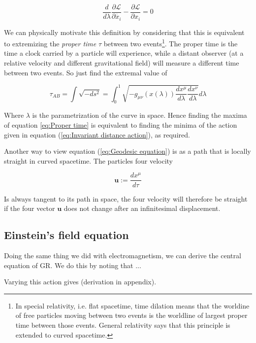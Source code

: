 \begin{equation}
    \frac{d}{d\lambda} \frac{\partial \mathcal{L}}{\partial \dot{x_i}} - \frac{\partial \mathcal{L}}{\partial x_i} = 0
\label{eq:Euler-Lagrange equation}
\end{equation}

We can physically motivate this definition by considering that this is equivalent to extremizing the \textit{proper time} $\tau$ between two events\footnote{In special relativity, i.e. flat spacetime, time dilation means that the worldine of free particles moving between two events is the worldline of largest proper time between those events. General relativity says that this principle is extended to curved spacetime.}. The proper time is the time a clock carried by a particle will experience, while a distant observer (at a relative velocity and different gravitational field) will measure a different time between two events. So just find the extremal value of

\begin{equation}
    \tau_{AB} = \int \sqrt{- ds^2} = \int_0^1 \sqrt{-g_{\mu \nu}(x(\lambda))
    \frac{dx^\mu}{d\lambda} \frac{dx^\nu}{d\lambda}}d\lambda 
\label{eq:Proper time}
\end{equation}

Where $\lambda$ is the parametrization of the curve in space. Hence finding the maxima of equation \ref{eq:Proper time} is equivalent to finding the minima of the action given in equation (\ref{eq:Invariant distance action}), as required.

Another way to view equation (\ref{eq:Geodesic equation}) is as a path that is locally straight in curved spacetime. The particles four velocity

\begin{equation}\label{eq:Four velocity}
    \boldsymbol{u} := \frac{dx^\mu}{d\tau}
\end{equation}

Is always tangent to its path in space, the four velocity will therefore be straight if the four vector $\boldsymbol{u}$ does not change after an infinitesimal displacement.

\subsection{Einstein's field equation}
Doing the same thing we did with electromagnetism, we can derive the central equation of GR. We do this by noting that ...

Varying this action gives (derivation in appendix).


